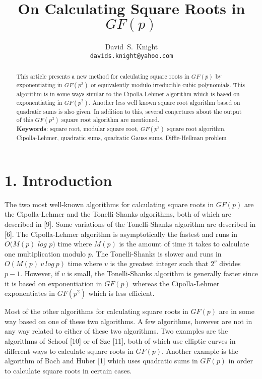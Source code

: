 \documentclass[final,letterpaper,oneside,10pt]{article}
\author{David~S.~Knight \\  \texttt{davids.knight@yahoo.com}}
\date{}
\title{On Calculating Square Roots in $GF(p)$}
\begin{document}
\maketitle



\begin {abstract} 
This article presents a new method for calculating square roots in $GF(p)$
by exponentiating in $GF(p^3)$ or equivalently modulo irreducible cubic polynomials.  This algorithm
is in some ways similar to the Cipolla-Lehmer algorithm which is based on exponentiating in $GF(p^2)$.
Another less well known square root algorithm based on quadratic sums is also given.  In addition to this,
several conjectures about the output of this $GF(p^3)$ square root algorithm are mentioned.
\\
\textbf{Keywords}: square root, modular square root, $GF(p^3)$ square root algorithm, Cipolla-Lehmer,
quadratic sums, quadratic Gauss sums, Diffie-Hellman problem

\end{abstract}


\section*{1. Introduction}
The two most well-known algorithms for calculating square roots in $GF(p)$ are the Cipolla-Lehmer and the 
Tonelli-Shanks algorithms, both of which are described in [9].  Some variations of the Tonelli-Shanks algorithm
are described in [6].  The Cipolla-Lehmer algorithm is asymptotically the fastest and runs in $O(M(p)$ $log$  $p)$ time
where $M(p)$ is the amount of time it takes to calculate one multiplication modulo $p$.  The Tonelli-Shanks is slower 
and runs in $O(M(p)~v~log~p)$ time where $v$ is the greatest integer such that $2^v$ divides $p-1$.
However, if $v$ is small, the Tonelli-Shanks algorithm is generally faster since it is based on exponentiation in $GF(p)$
whereas the Cipolla-Lehmer exponentiates in $GF(p^2)$ which is less efficient.

Most of the other algorithms for calculating square roots in $GF(p)$ are in some way based on one of these two 
algorithms.  A few algorithms, however are not in any way related to either of these two algorithms.  Two examples 
are the algorithms of Schoof [10] or of Sze [11], both of which use elliptic curves in different ways to calculate square
roots in $GF(p)$.  Another example is the algorithm of Bach and Huber [1] which uses quadratic sums in $GF(p)$
in order to calculate square roots in certain cases.
\end{document}
